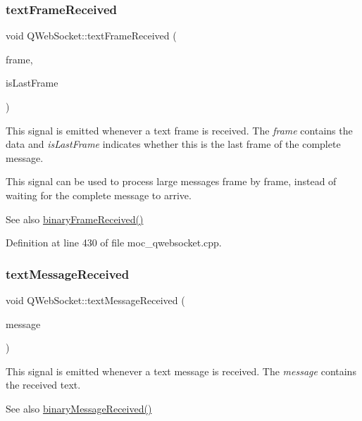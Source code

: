 \subsubsection{\texorpdfstring{text\+Frame\+Received}{textFrameReceived}}
{\footnotesize\ttfamily void Q\+Web\+Socket\+::text\+Frame\+Received (\begin{DoxyParamCaption}\item[{const Q\+String \&}]{frame,  }\item[{bool}]{is\+Last\+Frame }\end{DoxyParamCaption})\hspace{0.3cm}{\ttfamily [signal]}}

This signal is emitted whenever a text frame is received. The {\itshape frame} contains the data and {\itshape is\+Last\+Frame} indicates whether this is the last frame of the complete message.

This signal can be used to process large messages frame by frame, instead of waiting for the complete message to arrive.

\begin{DoxySeeAlso}{See also}
\mbox{\hyperlink{class_q_web_socket_a43bf9793d8edec549ea45d503e9be366}{binary\+Frame\+Received()}} 
\end{DoxySeeAlso}


Definition at line 430 of file moc\+\_\+qwebsocket.\+cpp.

\mbox{\label{class_q_web_socket_ad0f93d1bf2b5e973dbc3acc4378505e4}} 
\subsubsection{\texorpdfstring{text\+Message\+Received}{textMessageReceived}}
{\footnotesize\ttfamily void Q\+Web\+Socket\+::text\+Message\+Received (\begin{DoxyParamCaption}\item[{const Q\+String \&}]{message }\end{DoxyParamCaption})\hspace{0.3cm}{\ttfamily [signal]}}

This signal is emitted whenever a text message is received. The {\itshape message} contains the received text.

\begin{DoxySeeAlso}{See also}
\mbox{\hyperlink{class_q_web_socket_aaefdf77b949880d571e64a30b01f75e7}{binary\+Message\+Received()}} 
\end{DoxySeeAlso}


